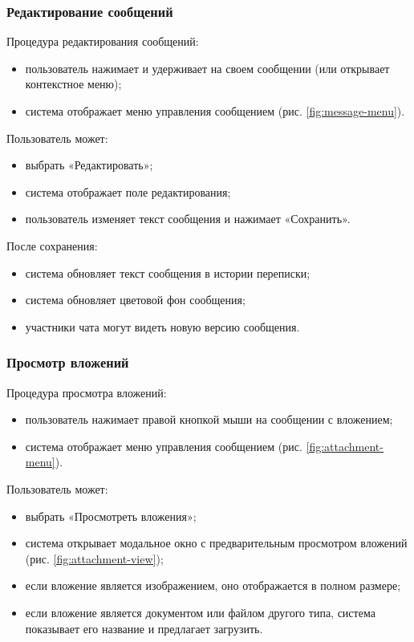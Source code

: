 \subsubsection{Редактирование сообщений}
Процедура редактирования сообщений:
\begin{itemize}
	\item пользователь нажимает и удерживает на своем сообщении (или открывает контекстное меню);
	\item система отображает меню управления сообщением (рис. \ref{fig:message-menu}).
\end{itemize}

Пользователь может:
\begin{itemize}
	\item выбрать «Редактировать»;
	\item система отображает поле редактирования;
	\item пользователь изменяет текст сообщения и нажимает «Сохранить».
\end{itemize}

После сохранения:
\begin{itemize}
	\item система обновляет текст сообщения в истории переписки;
	\item система обновляет цветовой фон сообщения;
	\item участники чата могут видеть новую версию сообщения.
\end{itemize}

\subsubsection{Просмотр вложений}  
Процедура просмотра вложений:
\begin{itemize}
	\item пользователь нажимает правой кнопкой мыши на сообщении с вложением;
	\item система отображает меню управления сообщением (рис. \ref{fig:attachment-menu}).
\end{itemize}

Пользователь может:
\begin{itemize}
	\item выбрать «Просмотреть вложения»;
	\item система открывает модальное окно с предварительным просмотром вложений (рис. \ref{fig:attachment-view});
	\item если вложение является изображением, оно отображается в полном размере;
	\item если вложение является документом или файлом другого типа, система показывает его название и предлагает загрузить.
\end{itemize}

